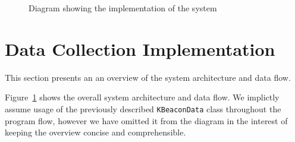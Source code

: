 




\begin{figure}[H]
  \centering
  \caption{Diagram showing the implementation of the system}
  \label{fig:implementation_diagram}
\end{figure}

\section{Data Collection Implementation}\label{sec:data_collection_implementation}
This section presents an an overview of the system architecture and data flow.

Figure~\ref{fig:implementation_diagram} shows the overall system architecture and data flow.
We implictly assume usage of the previously described \texttt{KBeaconData} class throughout the program flow, however we have omitted it from the diagram in the interest of keeping the overview concise and comprehensible.

